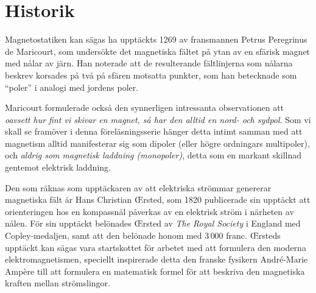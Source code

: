 \section{Historik}
Magnetostatiken kan s{\"a}gas ha uppt{\"a}ckts 1269 av fransmannen Petrus
Peregrinus de Maricourt, som
unders{\"o}kte det magnetiska f{\"a}ltet p{\aa} ytan av en sf{\"a}risk
magnet med n{\aa}lar av j{\"a}rn. Han noterade att de
resulterande f{\"a}ltlinjerna som n{\aa}larna beskrev korsades p{\aa} tv{\aa}
p{\aa} sf{\"a}ren motsatta punkter, som han betecknade som ``poler''
 i analogi
med jordens poler.

Maricourt formulerade ocks{\aa} den synnerligen intressanta observationen att
{\it oavsett hur fint vi skivar en magnet, s{\aa} har den alltid en nord- och
sydpol}. Som vi skall se fram{\"o}ver i denna f{\"o}rel{\"a}sningsserie
h{\"a}nger detta intimt samman med att magnetism alltid manifesterar sig
som dipoler (eller h{\"o}gre ordningars multipoler), och {\it aldrig som
magnetisk laddning (monopoler)}, detta som en markant
skillnad gentemot elektrisk laddning.

Den som r{\"a}knas som uppt{\"a}ckaren av att elektriska str{\"o}mmar genererar
magnetiska f{\"a}lt {\"a}r Hans Christian {\OE}rsted,  som 1820 publicerade sin uppt{\"a}ckt att orienteringen
hos en kompassn{\aa}l p{\aa}verkas av en elektrisk str{\"o}m i n{\"a}rheten av
n{\aa}len.
F{\"o}r sin uppt{\"a}ckt bel{\"o}nades {\OE}rsted av {\it The Royal Society} i
England med Copley-medaljen, samt att den  bel{\"o}nade
honom med $3\,000$ franc.
{\OE}rsteds uppt{\"a}ckt kan s{\"a}gas vara startskottet f{\"o}r arbetet med
att formulera den moderna elektromagnetismen, speciellt inspirerade detta den
franske fysikern Andr{\'e}-Marie Amp{\`e}re  till att formulera en matematisk formel f{\"o}r att beskriva den
magnetiska kraften mellan str{\"o}mslingor.
\vfill\eject

